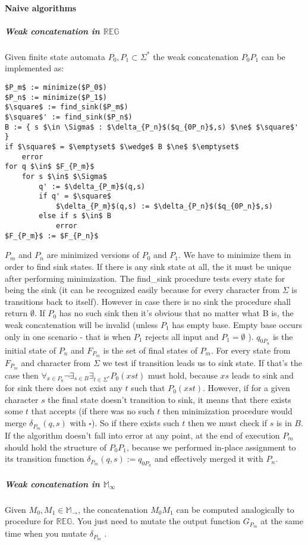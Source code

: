 \documentclass[12pt]{article}
\begin{document}
\paragraph{Naive algorithms}
\subparagraph{Weak concatenation in $\mathbb{REG}$}
Given finite state automata $P_0,P_1 \subset \Sigma^*$ the weak concatenation $P_0P_1 $ can be implemented as:
\begin{lstlisting}
$P_m$ := minimize($P_0$)
$P_n$ := minimize($P_1$)
$\square$ := find_sink($P_m$)
$\square$' := find_sink($P_n$)
B := { s $\in \Sigma$ : $\delta_{P_n}$($q_{0P_n}$,s) $\ne$ $\square$' }
if $\square$ = $\emptyset$ $\wedge$ B $\ne$ $\emptyset$
    error
for q $\in$ $F_{P_m}$ 
    for s $\in$ $\Sigma$
        q' := $\delta_{P_m}$(q,s)
        if q' = $\square$ 
            $\delta_{P_m}$(q,s) := $\delta_{P_n}$($q_{0P_n}$,s) 
        else if s $\in$ B
            error
$F_{P_m}$ := $F_{P_n}$
\end{lstlisting}
$P_m$ and $P_n$ are minimized versions of $P_0$ and $P_1$. We have to minimize them in order to find sink states.  If there is any sink state at all, the it must be unique after performing minimization. The find\_sink procedure tests every state for being the sink (it can be recognized easily because for every character from $\Sigma$ is transitions back to itself). However in case there is no sink the procedure shall return $\emptyset$. If $P_0$ has no such sink then it's obvious that no matter what B is, the weak concatenation will be invalid (unless  $P_1$ has empty base. Empty base occurs only in one scenario - that is when $P_1$ rejects all input and $P_1 = \emptyset$ ). $q_{0P_n}$ is the initial state of $P_n$ and $F_{P_m}$ is the set of final states of $P_m$. For every state from $F_{P_m}$ and character from $\Sigma$ we test if transition leads us to sink state. If that's the case then $\forall_{x\in P_0} \neg \exists_{s\in B} \exists_{t\in\Sigma^*} P_0(xst)$ must hold, because $xs$ leads to sink and for sink there does not exist any $t$ such that $ P_0(xst)$. However, if for a given  character $s$ the final state doesn't transition to sink, it means that there exists some $t$ that accepts (if there was no such $t$ then minimization procedure would merge $\delta_{P_m}(q,s)$ with $\square$). So if there exists such $t$ then we must check if $s$ is in $B$. If the algorithm doesn't fall into error at any point, at the end of execution $P_m$ should hold the structure of $P_0P_1$, because we performed in-place assignment to its transition function $\delta_{P_m}(q,s) := q_{0P_n}$ and effectively merged it with $P_n$.
\subparagraph{Weak concatenation in $\mathbb{M}_\infty$} Given $M_0,M_1 \in \mathbb{M}_\rightarrow$, the concatenation $M_0M_1$ can be computed analogically to procedure for $\mathbb{ REG}$. You just need to mutate the output function $G_{P_m}$ at the same time when you mutate $\delta_{P_m}$ . 
\end{document}
